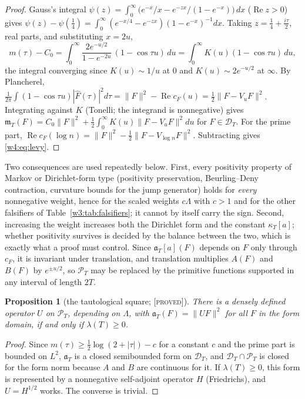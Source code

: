 \documentclass[11pt]{amsart}
\newtheorem{proposition}[theorem]{Proposition}
\theoremstyle{definition}
\theoremstyle{remark}
\numberwithin{equation}{section}
\DeclareMathOperator{\Rel}{Re}
\newcommand{\Fh}{\widehat F}                           %
\newcommand{\cF}{c_F}                                  %
\newcommand{\PT}{\mathcal{P}_T}                        %
\newcommand{\DT}{\mathcal{D}_T}                        %
\newcommand{\mT}{\mathfrak{m}_T}                       %
\newcommand{\aT}{\mathfrak{a}_T}                       %
\newcommand{\lam}{\lambda(T)}                          %
\newcommand{\stag}[1]{\textsc{[#1]}}
\newcommand{\PROVED}{\stag{proved}}
\begin{document}
\begin{proof}
Gauss's integral $\psi(z)=\int_0^\infty\big(e^{-x}/x-e^{-zx}/(1-e^{-x})\big)\,dx$ ($\Rel z>0$) gives
$\psi(z)-\psi(\tfrac14)=\int_0^\infty(e^{-x/4}-e^{-zx})(1-e^{-x})^{-1}dx$. Taking $z=\frac14+\frac{i\tau}2$, real parts, and substituting $x=2u$,
\[
m(\tau)-C_0=\int_0^\infty\frac{2e^{-u/2}}{1-e^{-2u}}\,(1-\cos\tau u)\,du=\int_0^\infty K(u)(1-\cos\tau u)\,du ,
\]
the integral converging since $K(u)\sim1/u$ at $0$ and $K(u)\sim2e^{-u/2}$ at $\infty$. By Plancherel,
$\frac1{2\pi}\int(1-\cos\tau u)|\Fh(\tau)|^2d\tau=\|F\|^2-\Rel\cF(u)=\frac12\|F-V_uF\|^2$. Integrating against $K$ (Tonelli; the integrand is
nonnegative) gives $\mT(F)=C_0\|F\|^2+\frac12\int_0^\infty K(u)\|F-V_uF\|^2du$ for $F\in\DT$. For the prime part,
$\Rel\cF(\log n)=\|F\|^2-\frac12\|F-V_{\log n}F\|^2$. Subtracting gives \eqref{w4:eq:levy}.
\end{proof}

Two consequences are used repeatedly below. First, every positivity property of Markov or Dirichlet-form type
(positivity preservation, Beurling--Deny contraction, curvature bounds for the jump generator) holds for
\emph{every} nonnegative weight, hence for the scaled weights $c\Lambda$ with $c>1$ and for the other falsifiers of
Table~\ref{w3:tab:falsifiers}; it cannot by itself carry the sign. Second, increasing the weight increases both the
Dirichlet form and the constant $\kappa_T[a]$; whether positivity survives is decided by the balance between the two,
which is exactly what a proof must control. Since $\aT[a](F)$ depends on $F$ only through $\cF$, it is invariant under translation, and
translation multiplies $A(F)$ and $B(F)$ by $e^{\pm u/2}$, so $\PT$ may be replaced by the primitive functions supported in any
interval of length $2T$.

\begin{proposition}[the tautological square; \PROVED]\label{w4:prop:taut}
There is a densely defined operator $U$ on $\PT$, depending on $\Lambda$, with $\aT(F)=\|UF\|^2$ for all $F$ in the form domain, if and only
if $\lam\ge0$.
\end{proposition}

\begin{proof}
Since $m(\tau)\ge\frac12\log(2+|\tau|)-c$ for a constant $c$ and the prime part is bounded on $L^2$, $\aT$ is a closed semibounded
form on $\DT$, and $\DT\cap\PT$ is closed for the form norm because $A$ and $B$ are continuous for it. If $\lam\ge0$, this form is represented by a nonnegative self-adjoint operator $H$ (Friedrichs), and
$U=H^{1/2}$ works. The converse is trivial.
\end{proof}
\end{document}
